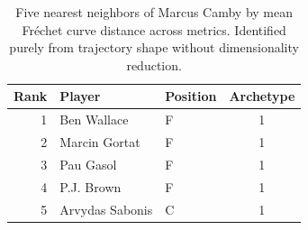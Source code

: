 \begin{table}[htbp]
  \centering\small
  \begin{tabular}{rllc}
    \toprule
    Rank & Player & Position & Archetype \\
    \midrule
    1 & Ben Wallace & F & 1 \\
    2 & Marcin Gortat & F & 1 \\
    3 & Pau Gasol & F & 1 \\
    4 & P.J. Brown & F & 1 \\
    5 & Arvydas Sabonis & C & 1 \\
    \bottomrule
  \end{tabular}
  \caption{Five nearest neighbors of Marcus Camby by mean Fr\'{e}chet curve distance across metrics. Identified purely from trajectory shape without dimensionality reduction.}
  \label{tab:Marcus_Camby_frechet_curve_neighbors}
\end{table}


